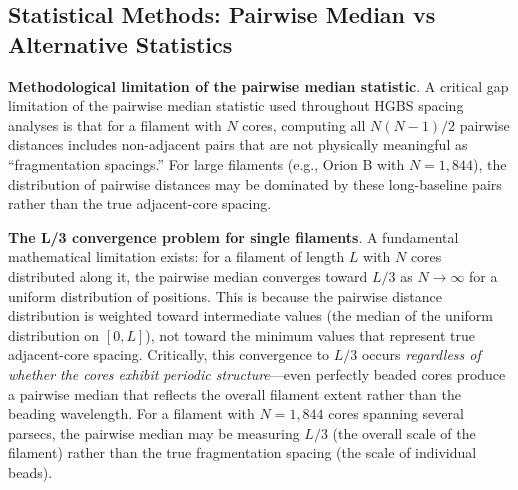 \documentclass[twoside,twocolumn]{mnras}
\begin{document}
\subsection{Statistical Methods: Pairwise Median vs Alternative Statistics}
\label{sec:statistics}

\textbf{Methodological limitation of the pairwise median statistic}. A critical gap limitation of the pairwise median statistic used throughout HGBS spacing analyses is that for a filament with $N$ cores, computing all $N(N-1)/2$ pairwise distances includes non-adjacent pairs that are not physically meaningful as ``fragmentation spacings.'' For large filaments (e.g., Orion B with $N = 1,844$), the distribution of pairwise distances may be dominated by these long-baseline pairs rather than the true adjacent-core spacing.

\textbf{The L/3 convergence problem for single filaments}. A fundamental mathematical limitation exists: for a filament of length $L$ with $N$ cores distributed along it, the pairwise median converges toward $L/3$ as $N \to \infty$ for a uniform distribution of positions. This is because the pairwise distance distribution is weighted toward intermediate values (the median of the uniform distribution on $[0, L]$), not toward the minimum values that represent true adjacent-core spacing. Critically, this convergence to $L/3$ occurs \textit{regardless of whether the cores exhibit periodic structure}—even perfectly beaded cores produce a pairwise median that reflects the overall filament extent rather than the beading wavelength. For a filament with $N = 1,844$ cores spanning several parsecs, the pairwise median may be measuring $L/3$ (the overall scale of the filament) rather than the true fragmentation spacing (the scale of individual beads).
\end{document}
